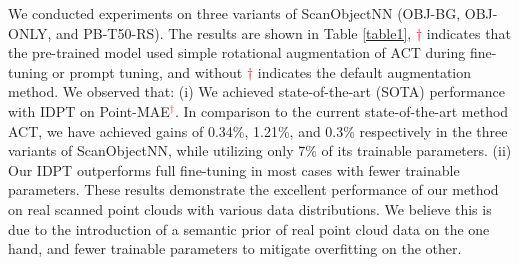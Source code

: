 \documentclass[10pt,twocolumn,letterpaper]{article}
\begin{document}
We conducted experiments on three variants of ScanObjectNN \cite{uy2019revisiting} (OBJ-BG, OBJ-ONLY, and PB-T50-RS). The results are shown in Table \ref{table1}, \textcolor{red}{$\dagger$} indicates that the pre-trained model used simple rotational augmentation of ACT during fine-tuning or prompt tuning, and without \textcolor{red}{$\dagger$} indicates the default augmentation method. We observed that: (i) We achieved state-of-the-art (SOTA) performance with IDPT on Point-MAE\textcolor{red}{$^\dagger$}. 
In comparison to the current state-of-the-art method ACT, we have achieved gains of 0.34\%, 1.21\%, and 0.3\% respectively in the three variants of ScanObjectNN, while utilizing only 7\% of its trainable parameters. 
(ii) Our IDPT outperforms full fine-tuning in most cases with fewer trainable parameters. These results demonstrate the excellent performance of our method on real scanned point clouds with various data distributions. We believe this is due to the introduction of a semantic prior of real point cloud data on the one hand, and fewer trainable parameters to mitigate overfitting on the other.
\end{document}
